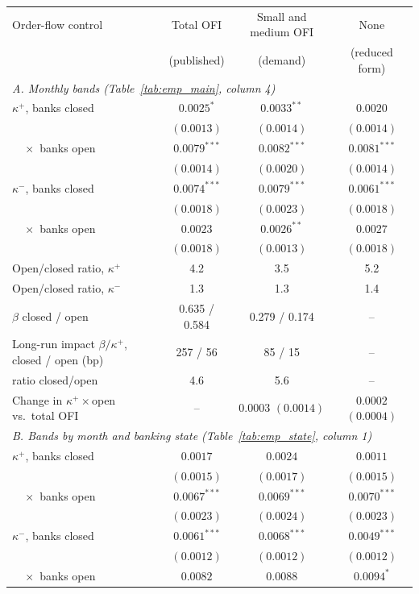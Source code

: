 \begin{tabular}{lccc}
\toprule
Order-flow control & Total OFI & Small and medium OFI & None \\
 & (published) & (demand) & (reduced form) \\
\midrule
\multicolumn{4}{l}{\emph{A. Monthly bands (Table~\ref{tab:emp_main}, column 4)}} \\
$\kappa^+$, banks closed & $0.0025^{*}$ & $0.0033^{**}$ & $0.0020$ \\
 & $(0.0013)$ & $(0.0014)$ & $(0.0014)$ \\
$\quad\times$ banks open & $0.0079^{***}$ & $0.0082^{***}$ & $0.0081^{***}$ \\
 & $(0.0014)$ & $(0.0020)$ & $(0.0014)$ \\
$\kappa^-$, banks closed & $0.0074^{***}$ & $0.0079^{***}$ & $0.0061^{***}$ \\
 & $(0.0018)$ & $(0.0023)$ & $(0.0018)$ \\
$\quad\times$ banks open & $0.0023$ & $0.0026^{**}$ & $0.0027$ \\
 & $(0.0018)$ & $(0.0013)$ & $(0.0018)$ \\
Open/closed ratio, $\kappa^+$ & 4.2 & 3.5 & 5.2 \\
Open/closed ratio, $\kappa^-$ & 1.3 & 1.3 & 1.4 \\
$\beta$ closed / open & 0.635 / 0.584 & 0.279 / 0.174 & -- \\
Long-run impact $\beta/\kappa^+$, closed / open (bp) & 257 / 56 & 85 / 15 & -- \\
\quad ratio closed/open & 4.6 & 5.6 & -- \\
Change in $\kappa^+\times$open vs.\ total OFI & -- & $0.0003$ $(0.0014)$ & $0.0002$ $(0.0004)$ \\
\midrule
\multicolumn{4}{l}{\emph{B. Bands by month and banking state (Table~\ref{tab:emp_state}, column 1)}} \\
$\kappa^+$, banks closed & $0.0017$ & $0.0024$ & $0.0011$ \\
 & $(0.0015)$ & $(0.0017)$ & $(0.0015)$ \\
$\quad\times$ banks open & $0.0067^{***}$ & $0.0069^{***}$ & $0.0070^{***}$ \\
 & $(0.0023)$ & $(0.0024)$ & $(0.0023)$ \\
$\kappa^-$, banks closed & $0.0061^{***}$ & $0.0068^{***}$ & $0.0049^{***}$ \\
 & $(0.0012)$ & $(0.0012)$ & $(0.0012)$ \\
$\quad\times$ banks open & $0.0082$ & $0.0088$ & $0.0094^{*}$ \\

\end{tabular}
